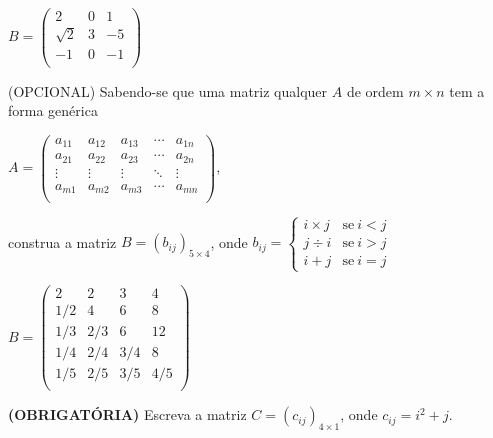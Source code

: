 \documentclass[pdftex, brazil, 12pt, oneside, addpoints]{exam}
\begin{document}
\begin{questions}
$B = \begin{pmatrix}
  2 & 0 & 1\\
  \sqrt{2} & 3 & -5\\
  -1 & 0 & -1\\
\end{pmatrix}$



\question
(OPCIONAL) Sabendo-se que uma matriz qualquer $A$ de ordem $m \times n$ tem a forma
genérica

$A = \begin{pmatrix}
  a_{11} & a_{12} & a_{13} & \cdots & a_{1n}\\
  a_{21} & a_{22} & a_{23} & \cdots & a_{2n}\\
  \vdots & \vdots & \vdots & \ddots & \vdots\\
  a_{m1} & a_{m2} & a_{m3} & \cdots & a_{mn}\\
\end{pmatrix}$,

construa a matriz $B = (b_{ij})_{5 \times 4}$, onde
$b_{ij} =
    \begin{cases}
      i \times j & \text{se}\ i < j\\
      j \div i   & \text{se}\ i > j\\
      i + j      & \text{se}\ i = j
    \end{cases}
$
\begin{solution}
$B = \begin{pmatrix}
   2    & 2    & 3    & 4\\
   1/2  & 4    & 6    & 8\\
   1/3  & 2/3  & 6    & 12\\
   1/4  & 2/4  & 3/4  & 8\\
   1/5  & 2/5  & 3/5  & 4/5\\
\end{pmatrix}$
\end{solution}

\question
\textbf{(OBRIGATÓRIA)} Escreva a matriz $C = (c_{ij})_{4 \times 1}$, onde $c_{ij} = i^2 + j$.


\end{questions}
\end{document}
